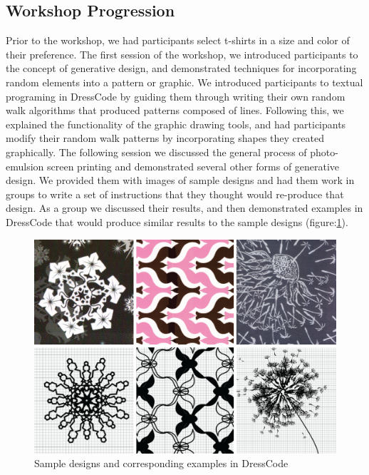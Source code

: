 \documentclass{sigchi}
\begin{document}
\subsection{Workshop Progression}
Prior to the workshop, we had participants select t-shirts in a size and color of their preference. The first session of the workshop, we introduced participants to the concept of generative design, and demonstrated techniques for incorporating random elements into a pattern or graphic. We introduced participants to textual programing in DressCode by guiding them through writing their own random walk algorithms that produced patterns composed of lines. Following this, we explained the functionality of the graphic drawing tools, and had participants modify their random walk patterns by incorporating shapes they created graphically. The following session we discussed the general process of photo-emulsion screen printing and demonstrated several other forms of generative design. We provided them with images of sample designs and had them work in groups to write a set of instructions that they thought would re-produce that design. As a group we discussed their results, and then demonstrated examples in DressCode that would produce similar results to the sample designs (figure:\ref{fig:example_designs}). 
\begin{center}
\begin{figure}[h!]
\includegraphics[width=\columnwidth]{images/pattern_examples.png}
\caption{Sample designs and corresponding examples in DressCode}
\label{fig:example_designs}
\end{figure}
\end{center}
\vspace{-20pt}
\end{document}
